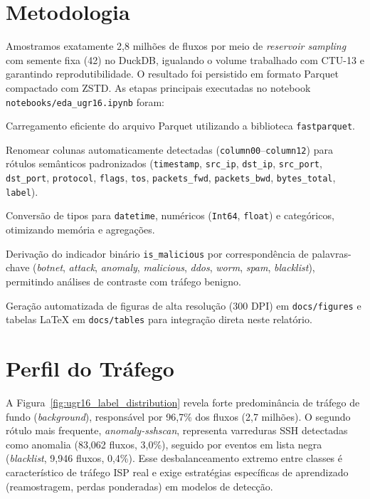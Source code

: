 \documentclass[a4paper, 12pt]{article}
\begin{document}
\section{Metodologia}
Amostramos exatamente 2{,}8 milhões de fluxos por meio de \textit{reservoir sampling} com semente fixa (42) no DuckDB, igualando o volume trabalhado com CTU-13 e garantindo reprodutibilidade. O resultado foi persistido em formato Parquet compactado com ZSTD. As etapas principais executadas no notebook \texttt{notebooks/eda\_ugr16.ipynb} foram:
\begin{compactitem}
    \item Carregamento eficiente do arquivo Parquet utilizando a biblioteca \texttt{fastparquet}.
    \item Renomear colunas automaticamente detectadas (\texttt{column00}--\texttt{column12}) para rótulos semânticos padronizados (\texttt{timestamp}, \texttt{src\_ip}, \texttt{dst\_ip}, \texttt{src\_port}, \texttt{dst\_port}, \texttt{protocol}, \texttt{flags}, \texttt{tos}, \texttt{packets\_fwd}, \texttt{packets\_bwd}, \texttt{bytes\_total}, \texttt{label}).
    \item Conversão de tipos para \texttt{datetime}, numéricos (\texttt{Int64}, \texttt{float}) e categóricos, otimizando memória e agregações.
    \item Derivação do indicador binário \texttt{is\_malicious} por correspondência de palavras-chave (\textit{botnet}, \textit{attack}, \textit{anomaly}, \textit{malicious}, \textit{ddos}, \textit{worm}, \textit{spam}, \textit{blacklist}), permitindo análises de contraste com tráfego benigno.
    \item Geração automatizada de figuras de alta resolução (300 DPI) em \texttt{docs/figures} e tabelas LaTeX em \texttt{docs/tables} para integração direta neste relatório.
\end{compactitem}

\section{Perfil do Tráfego}
A Figura~\ref{fig:ugr16_label_distribution} revela forte predominância de tráfego de fundo (\textit{background}), responsável por 96{,}7\% dos fluxos (2{,}7 milhões). O segundo rótulo mais frequente, \textit{anomaly-sshscan}, representa varreduras SSH detectadas como anomalia (83{,}062 fluxos, 3{,}0\%), seguido por eventos em lista negra (\textit{blacklist}, 9{,}946 fluxos, 0{,}4\%). Esse desbalanceamento extremo entre classes é característico de tráfego ISP real e exige estratégias específicas de aprendizado (reamostragem, perdas ponderadas) em modelos de detecção.
\end{document}
